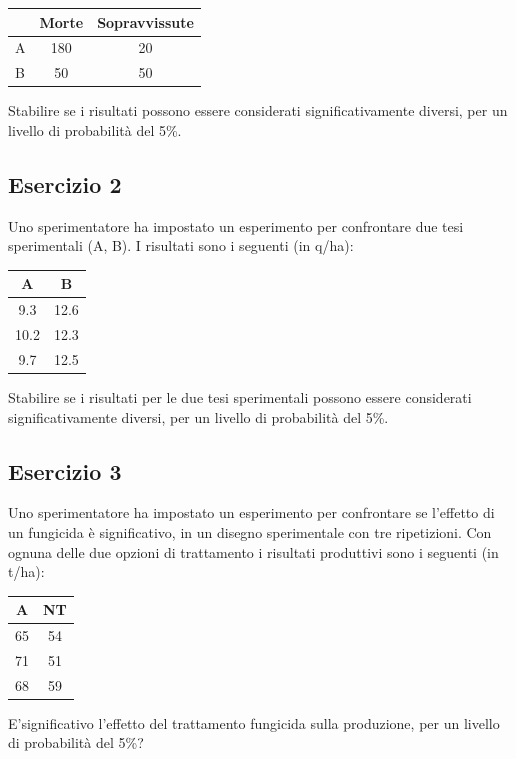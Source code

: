 \documentclass[a4paper,12pt,oneside]{book}
\begin{document}
\begin{longtable}[]{@{}lcc@{}}
\toprule
& Morte & Sopravvissute \\
\midrule
\endhead
A & 180 & 20 \\
B & 50 & 50 \\
\bottomrule
\end{longtable}

Stabilire se i risultati possono essere considerati significativamente diversi, per un livello di probabilità del 5\%.

\hypertarget{esercizio-2-4}{%
\subsection{Esercizio 2}\label{esercizio-2-4}}

Uno sperimentatore ha impostato un esperimento per confrontare due tesi sperimentali (A, B). I risultati sono i seguenti (in q/ha):

\begin{longtable}[]{@{}cc@{}}
\toprule
A & B \\
\midrule
\endhead
9.3 & 12.6 \\
10.2 & 12.3 \\
9.7 & 12.5 \\
\bottomrule
\end{longtable}

Stabilire se i risultati per le due tesi sperimentali possono essere considerati significativamente diversi, per un livello di probabilità del 5\%.

\hypertarget{esercizio-3-4}{%
\subsection{Esercizio 3}\label{esercizio-3-4}}

Uno sperimentatore ha impostato un esperimento per confrontare se l'effetto di un fungicida è significativo, in un disegno sperimentale con tre ripetizioni. Con ognuna delle due opzioni di trattamento i risultati produttivi sono i seguenti (in t/ha):

\begin{longtable}[]{@{}cc@{}}
\toprule
A & NT \\
\midrule
\endhead
65 & 54 \\
71 & 51 \\
68 & 59 \\
\bottomrule
\end{longtable}

E'significativo l'effetto del trattamento fungicida sulla produzione, per un livello di probabilità del 5\%?
\end{document}

